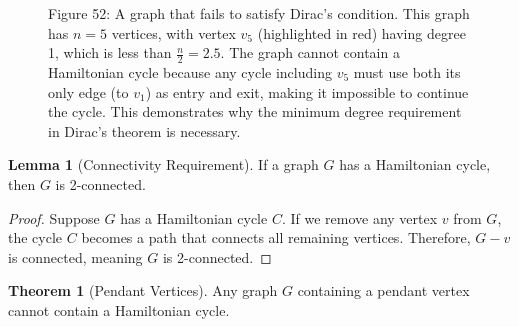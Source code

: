 \documentclass{article}
\theoremstyle{definition}
\def\deg{deg}%
\newtheorem{theorem}{Theorem}
\newtheorem{lemma}{Lemma}
\begin{document}
\begin{figure}[h!]
\begin{center}
\end{center}

\begin{center}
\small Figure 52: A graph that fails to satisfy Dirac's condition. This graph has $n = 5$ vertices, with vertex $v_5$ (highlighted in red) having degree 1, which is less than $\frac{n}{2} = 2.5$. The graph cannot contain a Hamiltonian cycle because any cycle including $v_5$ must use both its only edge (to $v_1$) as entry and exit, making it impossible to continue the cycle. This demonstrates why the minimum degree requirement in Dirac's theorem is necessary.
\end{center}
\end{figure}

\begin{lemma}[Connectivity Requirement]
If a graph $G$ has a Hamiltonian cycle, then $G$ is 2-connected.
\end{lemma}

\begin{proof}
Suppose $G$ has a Hamiltonian cycle $C$. If we remove any vertex $v$ from $G$, the cycle $C$ becomes a path that connects all remaining vertices. Therefore, $G-v$ is connected, meaning $G$ is 2-connected.
\end{proof}

\begin{theorem}[Pendant Vertices]
Any graph $G$ containing a pendant vertex cannot contain a Hamiltonian cycle.
\end{theorem}
\end{document}
